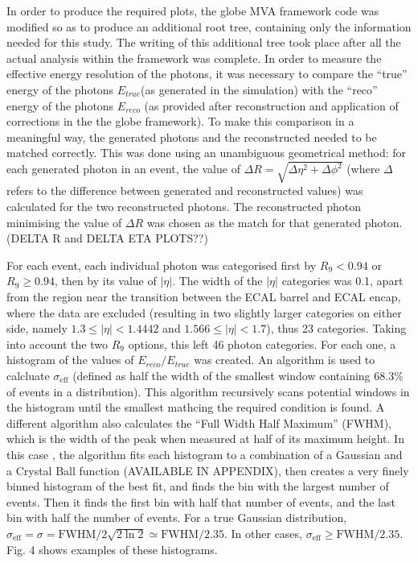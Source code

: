 \documentclass[10pt]{article}
\begin{document}
In order to produce the required plots, the globe MVA framework code was modified so as to produce an additional root tree, containing only the information needed for this study. The writing of this additional tree took place after all the actual analysis within the framework was complete. In order to measure the effective energy resolution of the photons, it was necessary to compare the ``true'' energy of the photons $E_{true}$(as generated in the simulation) with the ``reco'' energy of the photons $E_{reco}$ (as provided after reconstruction and application of corrections in the the globe framework). To make this comparison in a meaningful way, the generated photons and the reconstructed needed to be matched correctly. This was done using an unambiguous geometrical method: for each generated photon in an event, the value of $\Delta R = \sqrt{\Delta \eta^2 + \Delta \phi^2}$ (where $\Delta $ refers to the difference between generated and reconstructed values) was calculated for the two reconstructed photons. The reconstructed photon minimising the value of $\Delta R$ was chosen as the match for that generated photon. (DELTA R and DELTA ETA PLOTS??)

For each event, each individual photon was categorised first by $R_{9} <0.94$ or $R_{9} \geq 0.94$, then  by its value of $|\eta|$. The width of the $|\eta|$ categories was 0.1, apart from the region near the transition between the ECAL barrel and ECAL encap, where the data are excluded (resulting in two slightly larger categories on either side, namely $ 1.3 \leq |\eta| < 1.4442 $ and $1.566 \leq |\eta| < 1.7$), thus 23 categories. Taking into account the two $R_{9}$ options, this left 46 photon categories. For each one, a histogram of the values of $E_{reco}/E_{true}$ was created. An algorithm is used to calcluate $\sigma_{\text{eff}}$ (defined as half the width of the smallest window containing 68.3\% of events in a distribution). This algorithm recursively scans potential windows in the histogram until the smallest mathcing the required condition is found. A different algorithm also calculates  the ``Full Width Half Maximum'' (FWHM), which is the width of the peak when measured at half of its maximum height. In this case , the algorithm fits each histogram to a combination of a Gaussian and a Crystal Ball function (AVAILABLE IN APPENDIX), then creates a very finely binned histogram of the best fit, and finds the bin with the largest number of events. Then it finds the first bin with half that number of events, and the last bin with half the number of events. For a true Gaussian distribution, $\sigma_{\text{eff}} = \sigma = \text{FWHM}/2\sqrt{2\ln2} \simeq \text{FWHM}/2.35$. In other cases, $\sigma_{\text{eff}} \geq \text{FWHM}/2.35$. Fig. 4 shows examples of these histograms. 
\end{document}
